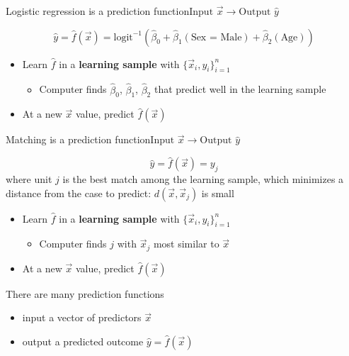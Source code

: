 \documentclass{beamer}
\begin{document}
\begin{frame}{Logistic regression is a prediction function}{$\text{Input }\vec{x}\rightarrow \text{Output }\hat{y}$}

$$
\hat{y} = \hat{f}(\vec{x}) = \text{logit}^{-1}\left(\hat\beta_0 + \hat\beta_1(\text{Sex = Male}) + \hat\beta_2(\text{Age})\right)
$$
\begin{itemize}
\item Learn $\hat{f}$ in a \textbf{learning sample} with $\{\vec{x}_i,y_i\}_{i=1}^n$
\begin{itemize}
\item Computer finds $\hat\beta_0$, $\hat\beta_1$, $\hat\beta_2$ that predict well in the learning sample
\end{itemize}
\item At a new $\vec{x}$ value, predict $\hat{f}(\vec{x})$
\end{itemize}

\end{frame}

\begin{frame}{Matching is a prediction function}{$\text{Input }\vec{x}\rightarrow \text{Output }\hat{y}$}

$$
\hat{y} = \hat{f}(\vec{x}) = y_j
$$
where unit $j$ is the best match among the learning sample, which minimizes a distance from the case to predict: $d(\vec{x},\vec{x}_j)$ is small
\begin{itemize}
\item Learn $\hat{f}$ in a \textbf{learning sample} with $\{\vec{x}_i,y_i\}_{i=1}^n$
\begin{itemize}
\item Computer finds $j$ with $\vec{x}_j$ most similar to $\vec{x}$
\end{itemize}
\item At a new $\vec{x}$ value, predict $\hat{f}(\vec{x})$
\end{itemize}

\end{frame}

\begin{frame}{There are many prediction functions}

\begin{itemize}
\item input a vector of predictors $\vec{x}$
\item output a predicted outcome $\hat{y} = \hat{f}(\vec{x})$
\end{itemize}

\end{frame}
\end{document}
